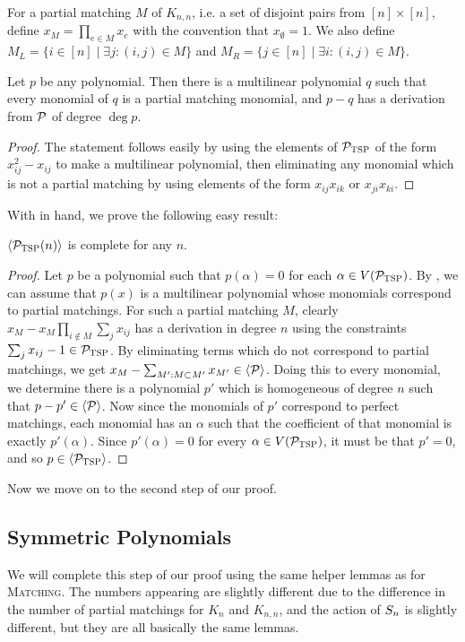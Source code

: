 For a partial matching $M$ of $K_{n,n}$, i.e. a set of disjoint pairs from $[n] \times [n]$, define $x_M = \prod_{e \in M} x_e$ with the convention that $x_{\emptyset} = 1$. We also define $M_L = \{i \in [n] \mid \exists j: (i,j) \in M\}$ and $M_R = \{j \in [n] \mid \exists i: (i,j) \in M\}$. 
\begin{lemma}\label{lem:tsp-monomials}
 Let $p$ be any polynomial. Then there is a multilinear polynomial $q$ such that every monomial of $q$ is a partial matching monomial, and $p-q$ has a derivation from $\mathcal P$ of degree $\deg p$.
\end{lemma}
\begin{proof}
The statement follows easily by using the elements of $\mathcal P_{\textsc{TSP}}$ of the form $x_{ij}^2 - x_{ij}$ to make a multilinear polynomial, then eliminating any monomial which is not a partial matching by using elements of the form $x_{ij}x_{ik}$ or $x_{ji}x_{ki}$. 
\end{proof}
With  in hand, we prove the following easy result:
\begin{lemma}\label{lem:tsp-complete}
$\langle \mathcal P_{\textsc{TSP}}(n) \rangle$ is complete for any $n$.  
\end{lemma}
\begin{proof}
Let $p$ be a polynomial such that $p(\alpha) = 0$ for each $\alpha \in V(\mathcal P_{\textsc{TSP}})$. By , we can assume that $p(x)$ is a multilinear polynomial whose monomials correspond to partial matchings. For such a partial matching $M$, clearly $x_M - x_M\prod_{i \notin M} \sum_j x_{ij}$ has a derivation in degree $n$ using the constraints $\sum_j x_{ij} - 1 \in \mathcal P_{\textsc{TSP}}$. By eliminating terms which do not correspond to partial matchings, we get $x_M - \sum_{M': M \subset M'} x_{M'} \in \langle \mathcal P \rangle$. Doing this to every monomial, we determine there is a polynomial $p'$ which is homogeneous of degree $n$ such that $p - p' \in \langle \mathcal P \rangle$. Now since the monomials of $p'$ correspond to perfect matchings, each monomial has an $\alpha$ such that the coefficient of that monomial is exactly $p'(\alpha)$. Since $p'(\alpha) = 0$ for every $\alpha \in V(\mathcal P_{\textsc{TSP}})$, it must be that $p' = 0$, and so $p \in \langle \mathcal P_{\textsc{TSP}} \rangle$.
\end{proof}
Now we move on to the second step of our proof. 

\subsection{Symmetric Polynomials}

We will complete this step of our proof using the same helper lemmas as for \textsc{Matching}. The numbers appearing are slightly different due to the difference in the number of partial matchings for $K_n$ and $K_{n,n}$, and the action of $S_{n}$ is slightly different, but they are all basically the same lemmas.

